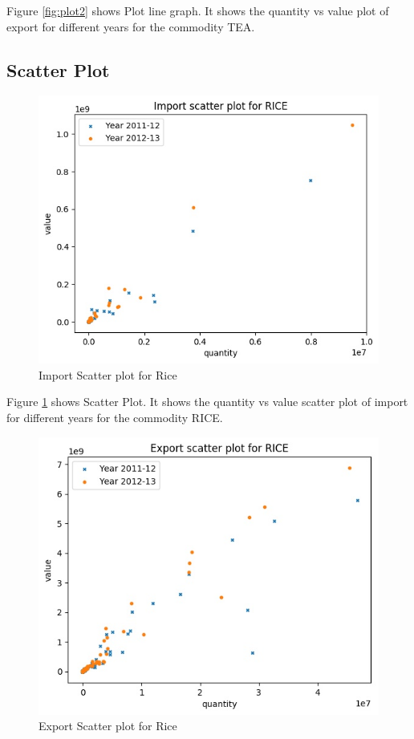 \documentclass[a4paper,11pt]{article}
\begin{document}
Figure \ref{fig:plot2} shows Plot line graph. It shows the quantity vs value plot of export for different years for the commodity TEA.


\subsection{Scatter Plot}
\begin{figure}[H]
\centering
\includegraphics[scale=0.80,width=\textwidth]{image7.jpg}
  \caption{Import Scatter plot for Rice}
  \label{fig:sc1}
  
\end{figure}

Figure \ref{fig:sc1} shows Scatter Plot. It shows the quantity vs value scatter plot of import for different years for the commodity RICE.


\begin{figure}[H]
\centering
\includegraphics[scale=0.80,width=\textwidth]{image8.jpg}
  \caption{Export Scatter plot for Rice}
  \label{fig:sc2}
  
\end{figure}
\end{document}
